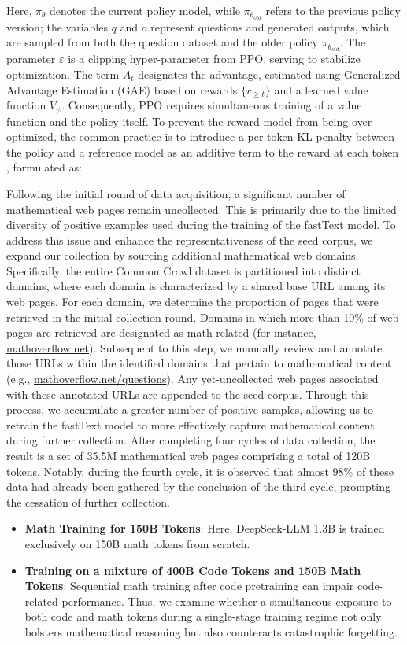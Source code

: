 \begin{itemize}[topsep=0pt]
Here, $\pi_{\theta}$ denotes the current policy model, while $\pi_{\theta_{old}}$ refers to the previous policy version; the variables $q$ and $o$ represent questions and generated outputs, which are sampled from both the question dataset and the older policy $\pi_{\theta_{old}}$. The parameter $\varepsilon$ is a clipping hyper-parameter from PPO, serving to stabilize optimization. The term $A_t$ designates the advantage, estimated using Generalized Advantage Estimation (GAE) \citep{gae} based on rewards $\{r_{\ge t}\}$ and a learned value function $V_{\psi}$. Consequently, PPO requires simultaneous training of a value function and the policy itself. To prevent the reward model from being over-optimized, the common practice is to introduce a per-token KL penalty between the policy and a reference model as an additive term to the reward at each token \citep{ouyang2022training}, formulated as:

Following the initial round of data acquisition, a significant number of mathematical web pages remain uncollected. This is primarily due to the limited diversity of positive examples used during the training of the fastText model. To address this issue and enhance the representativeness of the seed corpus, we expand our collection by sourcing additional mathematical web domains. Specifically, the entire Common Crawl dataset is partitioned into distinct domains, where each domain is characterized by a shared base URL among its web pages. For each domain, we determine the proportion of pages that were retrieved in the initial collection round. Domains in which more than 10\% of web pages are retrieved are designated as math-related (for instance, \url{mathoverflow.net}).
Subsequent to this step, we manually review and annotate those URLs within the identified domains that pertain to mathematical content (e.g., \url{mathoverflow.net/questions}). Any yet-uncollected web pages associated with these annotated URLs are appended to the seed corpus. Through this process, we accumulate a greater number of positive samples, allowing us to retrain the fastText model to more effectively capture mathematical content during further collection. After completing four cycles of data collection, the result is a set of 35.5M mathematical web pages comprising a total of 120B tokens. Notably, during the fourth cycle, it is observed that almost 98\% of these data had already been gathered by the conclusion of the third cycle, prompting the cessation of further collection.

\begin{itemize}[topsep=0pt]
    \item \textbf{Math Training for 150B Tokens}: Here, DeepSeek-LLM 1.3B is trained exclusively on 150B math tokens from scratch.
    \item \textbf{Training on a mixture of 400B Code Tokens and 150B Math Tokens}: Sequential math training after code pretraining can impair code-related performance. Thus, we examine whether a simultaneous exposure to both code and math tokens during a single-stage training regime not only bolsters mathematical reasoning but also counteracts catastrophic forgetting.
\end{itemize}


\end{itemize}
